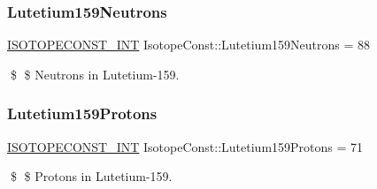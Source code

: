 \subsubsection{\texorpdfstring{Lutetium159\+Neutrons}{Lutetium159Neutrons}}
{\footnotesize\ttfamily \mbox{\hyperlink{group___isotope_const-_macros_ga5f18360b3e99483a35c32d789e62621c}{I\+S\+O\+T\+O\+P\+E\+C\+O\+N\+S\+T\+\_\+\+I\+NT}} Isotope\+Const\+::\+Lutetium159\+Neutrons = 88}

\$ \$ Neutrons in Lutetium-\/159. \mbox{\label{group___isotope_const-_lutetium-_lu159_ga22a23e0ba306af9402b0ea2756f7444b}} 
\subsubsection{\texorpdfstring{Lutetium159\+Protons}{Lutetium159Protons}}
{\footnotesize\ttfamily \mbox{\hyperlink{group___isotope_const-_macros_ga5f18360b3e99483a35c32d789e62621c}{I\+S\+O\+T\+O\+P\+E\+C\+O\+N\+S\+T\+\_\+\+I\+NT}} Isotope\+Const\+::\+Lutetium159\+Protons = 71}

\$ \$ Protons in Lutetium-\/159. 